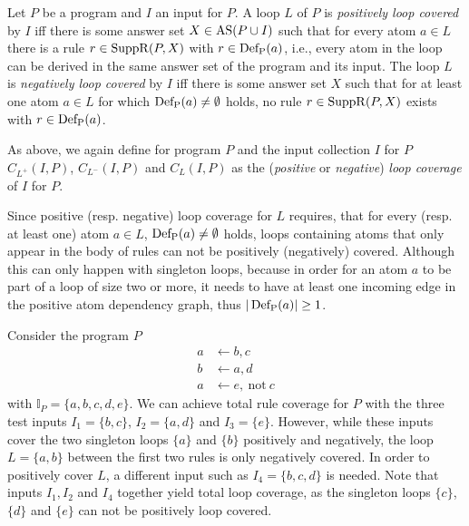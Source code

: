 \begin{definition}
\label{def:loop coverage}
    Let $P$ be a program and $I$ an input for $P$. A loop $L$ of $P$ is \emph{positively loop covered} by $I$ iff there is some answer set \(X \in \operatorname{AS}(P \cup I)\) such that for every atom \(a \in L\) there is a rule \(r \in \operatorname{SuppR}(P, X)\) with \(r \in \operatorname{Def_P}(a)\), i.e., every atom in the loop can be derived in the same answer set of the program and its input.
    The loop $L$ is \emph{negatively loop covered} by $I$ iff there is some answer set $X$ such that for at least one atom \(a \in L\) for which \(\operatorname{Def_P}(a) \neq \emptyset\) holds, no rule \(r \in \operatorname{SuppR}(P, X)\) exists with \(r \in \operatorname{Def_P}(a)\).
\end{definition}

As above, we again define for program $P$ and the input collection $I$ for $P$ \(C_{L^+}(I, P)\), \(C_{L^-}(I, P)\) and \(C_{L}(I, P)\) as the (\emph{positive} or \emph{negative}) \emph{loop coverage} of $I$ for $P$.

Since positive (resp. negative) loop coverage for $L$ requires, that for every (resp. at least one) atom \(a \in L\), \(\operatorname{Def_P}(a) \neq \emptyset\) holds, loops containing atoms that only appear in the body of rules can not be positively (negatively) covered. Although this can only happen with singleton loops, because in order for an atom $a$ to be part of a loop of size two or more, it needs to have at least one incoming edge in the positive atom dependency graph, thus \(| \operatorname{Def_P}(a) | \geq 1\).

\begin{example}
\label{ex:loop coverage}
    Consider the program $P$
    \begin{align*}
        a &\leftarrow b, c \\
        b &\leftarrow a, d \\
        a &\leftarrow e,\ \text{not}\ c
    \end{align*}
    with \(\mathbb{I}_P = \{a, b, c, d, e\}\). We can achieve total rule coverage for $P$ with the three test inputs \(I_1 = \{b, c\}\), \(I_2 = \{a, d\}\) and \(I_3 = \{e\}\). However, while these inputs cover the two singleton loops \(\{a\}\) and \(\{b\}\) positively and negatively, the loop \(L = \{a, b\}\) between the first two rules is only negatively covered. In order to positively cover $L$, a different input such as \(I_4 = \{b, c, d\}\) is needed.
    Note that inputs \(I_1, I_2\) and \(I_4\) together yield total loop coverage, as the singleton loops \(\{c\}\), \(\{d\}\) and \(\{e\}\) can not be positively loop covered.
\end{example}

